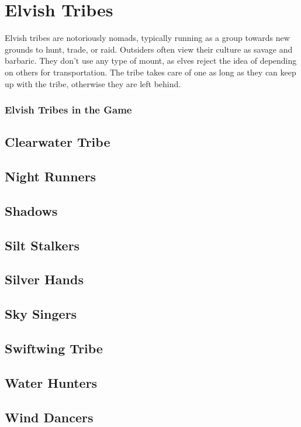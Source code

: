 \section{Elvish Tribes}


Elvish tribes are notoriously nomads, typically running as a group towards new grounds to hunt, trade, or raid. Outsiders often view their culture as savage and barbaric. They don't use any type of mount, as elves reject the idea of depending on others for transportation. The tribe takes care of one as long as they can keep up with the tribe, otherwise they are left behind.


\subsubsection{Elvish Tribes in the Game}


\subsection{Clearwater Tribe}
\subsection{Night Runners}
\subsection{Shadows}
\subsection{Silt Stalkers}
\subsection{Silver Hands}
\subsection{Sky Singers}
\subsection{Swiftwing Tribe}
\subsection{Water Hunters}
\subsection{Wind Dancers}
